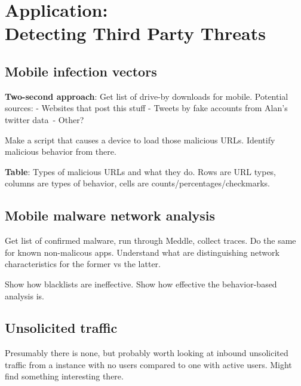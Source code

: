 \section{Application: \\
Detecting Third Party Threats}
\label{sec:malware}

\subsection{Mobile infection vectors}

\textbf{Two-second approach}: Get list of drive-by downloads for mobile. Potential sources:
- Websites that post this stuff
- Tweets by fake accounts from Alan's twitter data\
- Other?

Make a script that causes a device to load those malicious URLs. Identify malicious behavior from there.

\textbf{Table}: Types of malicious URLs and what they do. Rows are URL types, columns are types of behavior, cells are counts/percentages/checkmarks. 

\subsection{Mobile malware network analysis}

Get list of confirmed malware, run through Meddle, collect traces. Do the same for known non-malicous apps. 
Understand what are distinguishing network characteristics for the former vs the latter. 

Show how blacklists are ineffective. Show how effective the behavior-based analysis is.

\subsection{Unsolicited traffic}
Presumably there is none, but probably worth looking at inbound unsolicited traffic from a 
\meddle instance with no users compared to one with active users. Might find something interesting there.

